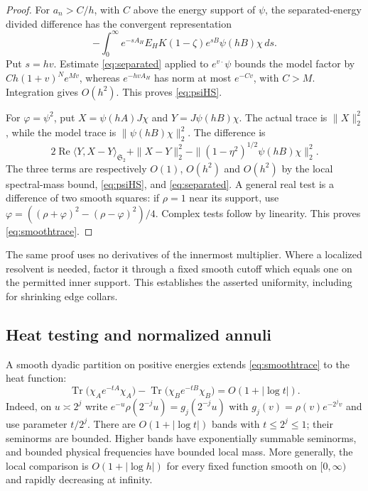 \documentclass[11pt]{amsart}
\numberwithin{equation}{section}
\theoremstyle{remark}
\newcommand{\Tr}{\operatorname{Tr}}
\newcommand{\Stwo}{\mathfrak{S}_2}
\begin{document}
\begin{proof}
For $a_n>C/h$, with $C$ above the energy support of $\psi$, the separated-energy divided difference has the convergent representation
\begin{equation}\label{eq:highenergy}
-\int_0^\infty e^{-sA_H}E_HK(1-\zeta)e^{sB}\psi(hB)\chi\,ds .
\end{equation}
Put $s=hv$. Estimate \eqref{eq:separated} applied to $e^{v\cdot}\psi$ bounds the model factor by $Ch(1+v)^Ne^{Mv}$, whereas $e^{-hvA_H}$ has norm at most $e^{-Cv}$, with $C>M$. Integration gives $O(h^2)$. This proves \eqref{eq:psiHS}.

For $\varphi=\psi^2$, put $X=\psi(hA)J\chi$ and $Y=J\psi(hB)\chi$. The actual trace is $\|X\|_2^2$, while the model trace is $\|\psi(hB)\chi\|_2^2$. The difference is
\begin{equation}\label{eq:tracediff}
2\operatorname{Re}\langle Y,X-Y\rangle_{\Stwo}+\|X-Y\|_2^2-\|(1-\eta^2)^{1/2}\psi(hB)\chi\|_2^2 .
\end{equation}
The three terms are respectively $O(1)$, $O(h^2)$ and $O(h^2)$ by the local spectral-mass bound, \eqref{eq:psiHS}, and \eqref{eq:separated}. A general real test is a difference of two smooth squares: if $\rho=1$ near its support, use $\varphi=((\rho+\varphi)^2-(\rho-\varphi)^2)/4$. Complex tests follow by linearity. This proves \eqref{eq:smoothtrace}.
\end{proof}

The same proof uses no derivatives of the innermost multiplier. Where a localized resolvent is needed, factor it through a fixed smooth cutoff which equals one on the permitted inner support. This establishes the asserted uniformity, including for shrinking edge collars.

\subsection{Heat testing and normalized annuli}\label{subsec:heat}
A smooth dyadic partition on positive energies extends \eqref{eq:smoothtrace} to the heat function:
\begin{equation}\label{eq:heatcompare}
\Tr\big(\chi_Ae^{-tA}\chi_A\big)-\Tr\big(\chi_Be^{-tB}\chi_B\big)=O(1+|\log t|) .
\end{equation}
Indeed, on $u\asymp2^j$ write $e^{-u}\rho(2^{-j}u)=g_j(2^{-j}u)$ with $g_j(v)=\rho(v)e^{-2^jv}$ and use parameter $t/2^j$. There are $O(1+|\log t|)$ bands with $t\le2^j\le1$; their seminorms are bounded. Higher bands have exponentially summable seminorms, and bounded physical frequencies have bounded local mass. More generally, the local comparison is $O(1+|\log h|)$ for every fixed function smooth on $[0,\infty)$ and rapidly decreasing at infinity.
\end{document}
